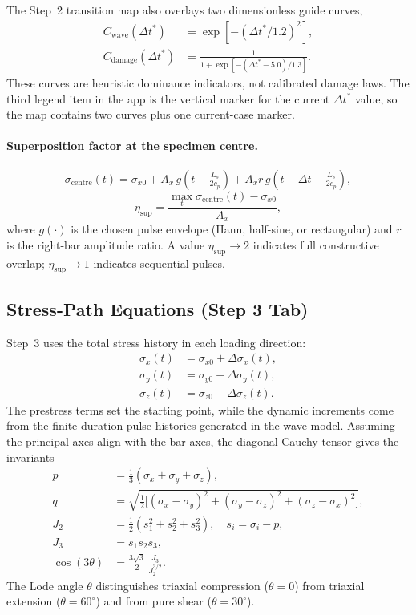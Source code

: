 \documentclass[11pt,a4paper]{article}
\newcommand{\sig}{\sigma}
\newcommand{\Ls}{L_s}
\begin{document}
The Step~2 transition map also overlays two dimensionless guide curves,
\begin{align}
  C_{\text{wave}}(\Delta t^\ast) &= \exp\!\left[-(\Delta t^\ast/1.2)^2\right], \\
  C_{\text{damage}}(\Delta t^\ast) &=
    \frac{1}{1+\exp\!\left[-(\Delta t^\ast-5.0)/1.3\right]}.
\end{align}
These curves are heuristic dominance indicators, not calibrated damage laws. The
third legend item in the app is the vertical marker for the current
$\Delta t^\ast$ value, so the map contains two curves plus one current-case
marker.

\paragraph{Superposition factor at the specimen centre.}
\begin{equation}
  \sig_{\text{centre}}(t) = \sig_{x0} + A_x\,g\!\left(t - \tfrac{\Ls}{2c_p}\right)
   + A_x r\,g\!\left(t - \Delta t - \tfrac{\Ls}{2c_p}\right),
\end{equation}
\begin{equation}
  \eta_{\text{sup}} = \frac{\max_t \sig_{\text{centre}}(t) - \sig_{x0}}{A_x},
\end{equation}
where $g(\cdot)$ is the chosen pulse envelope (Hann, half-sine, or rectangular)
and $r$ is the right-bar amplitude ratio. A value $\eta_{\text{sup}} \to 2$
indicates full constructive overlap; $\eta_{\text{sup}} \to 1$ indicates
sequential pulses.

\subsection{Stress-Path Equations (Step 3 Tab)}

Step~3 uses the total stress history in each loading direction:
\begin{align}
  \sig_x(t) &= \sig_{x0} + \Delta\sig_x(t), \\
  \sig_y(t) &= \sig_{y0} + \Delta\sig_y(t), \\
  \sig_z(t) &= \sig_{z0} + \Delta\sig_z(t).
\end{align}
The prestress terms set the starting point, while the dynamic increments come
from the finite-duration pulse histories generated in the wave model. Assuming
the principal axes align with the bar axes, the diagonal Cauchy tensor gives the
invariants
\begin{align}
  p &= \tfrac{1}{3}(\sig_x + \sig_y + \sig_z), \\
  q &= \sqrt{\tfrac{1}{2}\bigl[(\sig_x - \sig_y)^2 + (\sig_y - \sig_z)^2 + (\sig_z - \sig_x)^2\bigr]}, \\
  J_2 &= \tfrac{1}{2}(s_1^2 + s_2^2 + s_3^2), \quad s_i = \sig_i - p, \\
  J_3 &= s_1 s_2 s_3, \\
  \cos(3\theta) &= \frac{3\sqrt{3}}{2}\,\frac{J_3}{J_2^{3/2}}.
\end{align}
The Lode angle $\theta$ distinguishes triaxial compression
($\theta = 0$) from triaxial extension ($\theta = 60^\circ$) and from pure
shear ($\theta = 30^\circ$).
\end{document}
